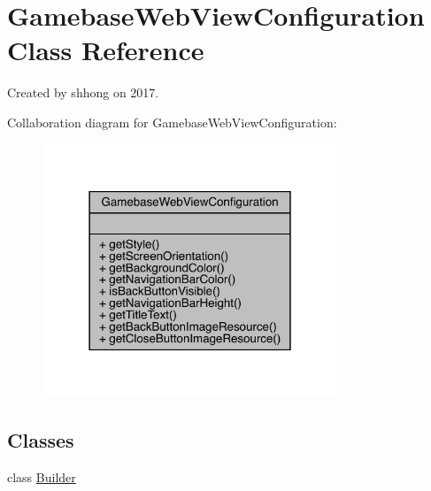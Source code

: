 \hypertarget{classcom_1_1toast_1_1android_1_1gamebase_1_1_gamebase_web_view_configuration}{}\section{Gamebase\+Web\+View\+Configuration Class Reference}
\label{classcom_1_1toast_1_1android_1_1gamebase_1_1_gamebase_web_view_configuration}


Created by shhong on 2017.  




Collaboration diagram for Gamebase\+Web\+View\+Configuration\+:\nopagebreak
\begin{figure}[H]
\begin{center}
\leavevmode
\includegraphics[width=250pt]{classcom_1_1toast_1_1android_1_1gamebase_1_1_gamebase_web_view_configuration__coll__graph}
\end{center}
\end{figure}
\subsection*{Classes}
\begin{DoxyCompactItemize}
\item 
class \hyperlink{classcom_1_1toast_1_1android_1_1gamebase_1_1_gamebase_web_view_configuration_1_1_builder}{Builder}
\end{DoxyCompactItemize}

